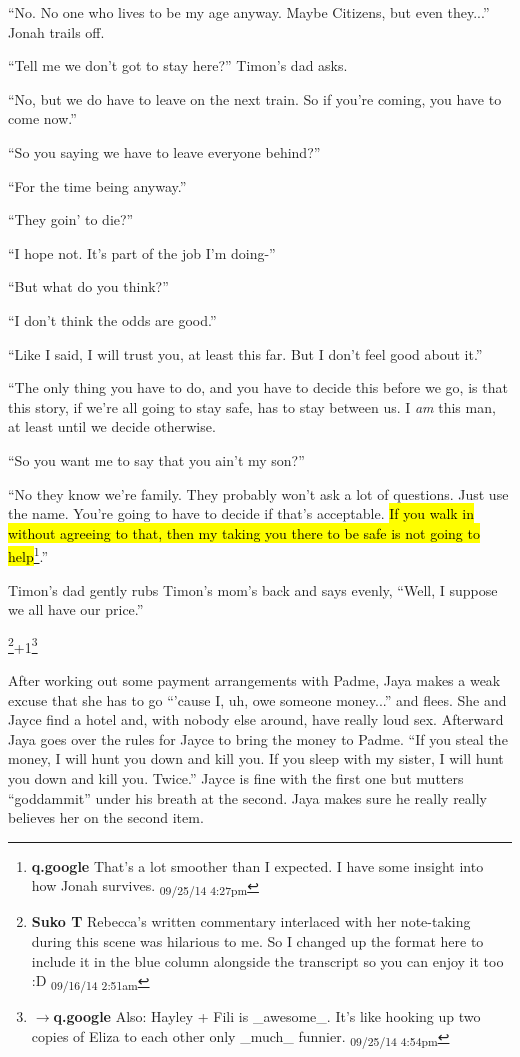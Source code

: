 ``No.  No one who lives to be my age anyway.  Maybe Citizens, but even they...'' Jonah trails off.

``Tell me we don't got to stay here?'' Timon's dad asks.

``No, but we do have to leave on the next train.  So if you're coming, you have to come now.''

``So you saying we have to leave everyone behind?''

``For the time being anyway.''

``They goin' to die?''

``I hope not.  It's part of the job I'm doing-''

``But what do you think?''

``I don't think the odds are good.''

``Like I said, I will trust you, at least this far.  But I don't feel good about it.''

``The only thing you have to do, and you have to decide this before we go, is that this story, if we're all going to stay safe, has to stay between us.  I \textit{am }this man, at least until we decide otherwise.

``So you want me to say that you ain't my son?''

``No they know we're family.  They probably won't ask a lot of questions.  Just use the name.  You're going to have to decide if that's acceptable.   \hl{If you walk in without agreeing to that, then my taking you there to be safe is not going to help}\footnote{\textbf{q.google }That's a lot smoother than I expected.  I have some insight into how Jonah survives. \textsubscript{09/25/14 4:27pm}}.''

Timon's dad gently rubs Timon's mom's back and says evenly, ``Well, I suppose we all have our price.''




\footnote{\textbf{Suko T }Rebecca's written commentary interlaced with her note-taking during this scene was hilarious to me.  So I changed up the format here to include it in the blue column alongside the transcript so you can enjoy it too :D \textsubscript{09/16/14 2:51am}}+1\footnote{$\rightarrow$\textbf{q.google }Also: Hayley + Fili is \_awesome\_.  It's like hooking up two copies of Eliza to each other only \_much\_ funnier. \textsubscript{09/25/14 4:54pm}}


After working out some payment arrangements with Padme, Jaya makes a weak excuse that she has to go ``'cause I, uh, owe someone money...'' and flees.  She and Jayce find a hotel and, with nobody else around, have really loud sex.  Afterward Jaya goes over the rules for Jayce to bring the money to Padme.  ``If you steal the money, I will hunt you down and kill you.  If you sleep with my sister, I will hunt you down and kill you.  Twice.''  Jayce is fine with the first one but mutters ``goddammit'' under his breath at the second.  Jaya makes sure he really really believes her on the second item.



